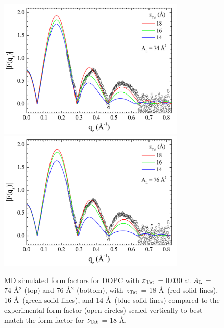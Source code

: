 \begin{figure}[htbp]
  \centering
  \includegraphics[width=0.8\textwidth]{figures/Tat/MD_Results/xff/dopc-tat4_74_sim-exp1}
  \includegraphics[width=0.8\textwidth]{figures/Tat/MD_Results/xff/dopc-tat4_76_sim-exp1}
  \caption{MD simulated form factors for DOPC with $x_\textrm{Tat}$ = 0.030 
  at $A_\textrm{L}$ = 74 \AA$^2$ (top) and 76 \AA$^2$ (bottom),
  with $z_\textrm{Tat}$ = 18 \AA\ (red solid lines), 16 \AA\ (green solid lines), 
  and 14 \AA\ (blue solid lines) compared to the experimental form factor 
  (open circles) scaled vertically to best match the form factor for 
  $z_\textrm{Tat}$ = 18 \AA.}
  \label{fig:MD_dopc-tat4_sim-exp}
\end{figure}

